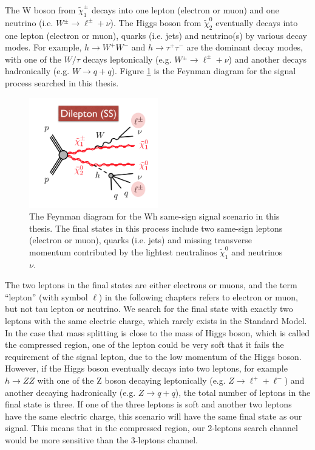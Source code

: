 The W boson from $\tilde{\chi}_1^\pm$ decays into one lepton (electron or muon) and one neutrino (i.e. $W{^\pm} \rightarrow \ell^{\pm} + \nu$).
The Higgs boson from $\tilde{\chi}_2^0$ eventually decays into one lepton (electron or muon), quarks (i.e. jets) and neutrino(s) by various decay modes.
For example, $h \rightarrow W^{+} W^{-} $ and $h \rightarrow \tau^{+} \tau^{-} $ are the dominant decay modes, with one of the $W / \tau$ decays leptonically (e.g. $W{^\pm} \rightarrow \ell^{\pm} + \nu$) and another decays hadronically (e.g. $W \rightarrow q + q$).
Figure \ref{fig:signal_feynman} is the Feynman diagram for the signal process searched in this thesis.

\begin{figure}
\centering
\includegraphics[width=0.5\textwidth]{data/photo/theory/signal_feynman.png}
\caption{The Feynman diagram for the Wh same-sign signal scenario in this thesis. The final states in this process include two same-sign leptons (electron or muon), quarks (i.e. jets) and missing transverse momentum contributed by the lightest neutralinos $\tilde{\chi}_1^0$ and neutrinos $\nu$.}
\label{fig:signal_feynman}
\end{figure}

The two leptons in the final states are either electrons or muons, and the term ``lepton'' (with symbol $\ell$) in the following chapters refers to electron or muon, but not tau lepton or neutrino.
We search for the final state with exactly two leptons with the same electric charge, which rarely exists in the Standard Model.
In the case that mass splitting is close to the mass of Higgs boson, which is called the compressed region, one of the lepton could be very soft that it fails the requirement of the signal lepton, due to the low momentum of the Higgs boson.
However, if the Higgs boson eventually decays into two leptons, for example $h \rightarrow ZZ$ with one of the Z boson decaying leptonically (e.g. $Z \rightarrow \ell^{+} + \ell^{-}$) and another decaying hadronically (e.g. $Z \rightarrow q + q$), the total number of leptons in the final state is three.
If one of the three leptons is soft and another two leptons have the same electric charge, this scenario will have the same final state as our signal.
This means that in the compressed region, our 2-leptons search channel would be more sensitive than the 3-leptons channel.

